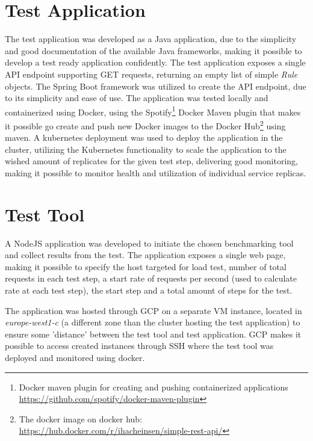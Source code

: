 \section{Test Application}
The test application was developed as a Java application, due to the simplicity and good documentation of the available Java frameworks, making it possible to develop a test ready application confidently. The test application exposes a single API endpoint supporting GET requests, returning an empty list of simple \textit{Rule} objects. The Spring Boot framework was utilized to create the API endpoint, due to its simplicity and ease of use. The application was tested locally and containerized using Docker, using the Spotify\footnote{Docker maven plugin for creating and pushing containerized applications \url{https://github.com/spotify/docker-maven-plugin}} Docker Maven plugin that makes it possible go create and push new Docker images to the Docker Hub\footnote{The docker image on docker hub: \url{https://hub.docker.com/r/ihacheinsen/simple-rest-api/}} using maven. A kubernetes deployment was  used to deploy the application in the cluster, utilizing the Kubernetes functionality to scale the application to the wished amount of replicates for the given test step, delivering good monitoring, making it possible to monitor health and utilization of individual service replicas.

\section{Test Tool}
A NodeJS application was developed to initiate the chosen benchmarking tool and collect results from the test. The application exposes a single web page, making it possible to specify the host targeted for load test, number of total requests in each test step, a start rate of requests per second (used to calculate rate at each test step), the start step and a total amount of steps for the test. 

The application was hosted through GCP on a separate VM instance, located in \textit{europe-west1-c} (a different zone than the cluster hosting the test application) to ensure some 'distance' between the test tool and test application. GCP makes it possible to access created instances through SSH where the test tool was deployed and monitored using docker.

